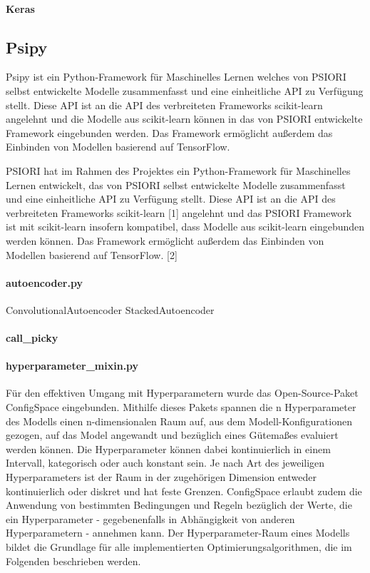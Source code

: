 		\paragraph{Keras}
		
		
		\subsection{Psipy}
		\label{subsec:Psipy}
			Psipy ist ein Python-Framework für Maschinelles Lernen welches von PSIORI selbst entwickelte Modelle zusammenfasst und eine einheitliche API zu Verfügung stellt. Diese API ist an die API des verbreiteten Frameworks scikit-learn angelehnt und die Modelle aus scikit-learn können in das von PSIORI entwickelte Framework eingebunden werden. Das Framework ermöglicht außerdem das Einbinden von Modellen basierend auf TensorFlow.\grqq [PSIORI]
			
			PSIORI hat im Rahmen des Projektes ein Python-Framework für Maschinelles Lernen entwickelt, das von PSIORI selbst entwickelte Modelle zusammenfasst und eine einheitliche API zu Verfügung stellt. Diese API ist an die API des verbreiteten Frameworks scikit-learn [1] angelehnt und das PSIORI Framework ist mit scikit-learn insofern kompatibel, dass Modelle aus scikit-learn eingebunden werden können. Das Framework ermöglicht außerdem das Einbinden von Modellen basierend auf TensorFlow. [2]
			
		\paragraph{autoencoder.py}
			ConvolutionalAutoencoder 
			StackedAutoencoder
		\paragraph{call\_picky}
		\paragraph{hyperparameter\_mixin.py} 
			\cite{Lindauer.}
		
		Für den effektiven Umgang mit Hyperparametern wurde das Open-Source-Paket ConfigSpace 	\cite{Lindauer.} eingebunden. Mithilfe dieses Pakets spannen die n Hyperparameter des Modells einen n-dimensionalen Raum auf, aus dem Modell-Konfigurationen gezogen, auf das Model angewandt und bezüglich eines Gütemaßes evaluiert werden können. Die Hyperparameter können dabei kontinuierlich in einem Intervall, kategorisch oder auch konstant sein. Je nach Art des jeweiligen Hyperparameters ist der Raum in der zugehörigen Dimension entweder kontinuierlich oder diskret und hat feste Grenzen. ConfigSpace erlaubt zudem die Anwendung von bestimmten Bedingungen und Regeln bezüglich der Werte, die ein Hyperparameter - gegebenenfalls in Abhängigkeit von anderen Hyperparametern - annehmen kann. Der Hyperparameter-Raum eines Modells bildet die Grundlage für alle implementierten Optimierungsalgorithmen, die im Folgenden beschrieben werden.
		
